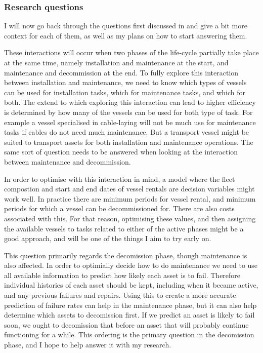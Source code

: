 \documentclass[a4paper,12pt]{article}
\begin{document}
\subsubsection{Research questions} \label{sss:questions}
I will now go back through the questions first discussed in  and give a bit more context for each of them, as well as my plans on how to start answering them. 

\sqa*

These interactions will occur when two phases of the life-cycle partially take place at the same time, namely installation and maintenance at the start, and maintenance and decommission at the end. To fully explore this interaction between installation and maintenance, we need to know which types of vessels can be used for installation tasks, which for maintenance tasks, and which for both. The extend to which exploring this interaction can lead to higher efficiency is determined by how many of the vessels can be used for both type of task. For example a vessel specialised in cable-laying will not be much use for maintenance tasks if cables do not need much maintenance. But a transport vessel might be suited to transport assets for both installation and maintenance operations. The same sort of question needs to be answered when looking at the interaction between maintenance and decommission. 

In order to optimise with this interaction in mind, a model where the fleet compostion and start and end dates of vessel rentals are decision variables might work well. In practice there are minimum periods for vessel rental, and minimum periods for which a vessel can be decommissioned for. There are also costs associated with this. For that reason, optimising these values, and then assigning the available vessels to tasks related to either of the active phases might be a good approach, and will be one of the things I aim to try early on.

\sqb*

This question primarily regards the decomission phase, though maintenance is also affected. In order to optimially decide how to do maintenance we need to use all available information to predict how likely each asset is to fail. Therefore individual histories of each asset should be kept, including when it became active, and any previous failures and repairs. Using this to create a more accurate prediction of failure rates can help in the maintenance phase, but it can also help determine which assets to decomission first. If we predict an asset is likely to fail soon, we ought to decomission that before an asset that will probably continue functioning for a while. This ordering is the primary question in the decomission phase, and I hope to help answer it with my research.
\end{document}
